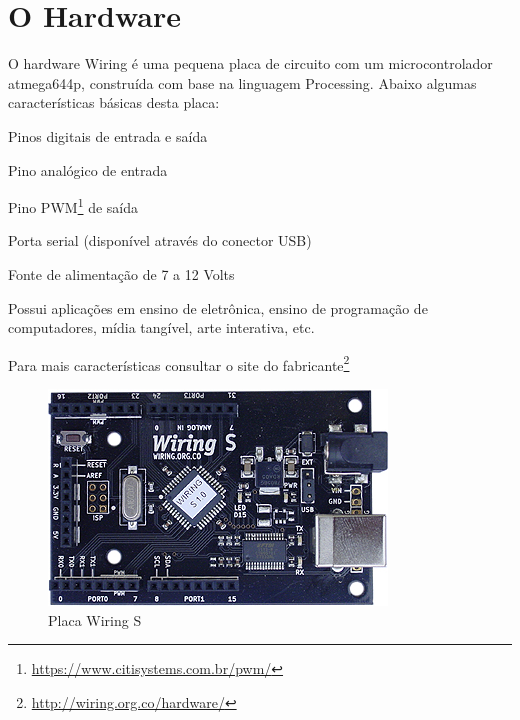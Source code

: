 \section[O Hardware]{O Hardware}

O hardware Wiring é uma pequena placa de circuito com um microcontrolador atmega644p, construída com base na linguagem Processing. Abaixo algumas características básicas desta placa: 

\begin{alineas}
    \item Pinos digitais de entrada e saída
    \item Pino analógico de entrada
    \item Pino PWM\footnote{\url{https://www.citisystems.com.br/pwm/}} de saída
    \item Porta serial (disponível através do conector USB)
    \item Fonte de alimentação de 7 a 12 Volts
\end{alineas}

Possui aplicações em ensino de eletrônica, ensino de programação de computadores, mídia tangível, arte interativa, etc.

Para mais características consultar o site do fabricante\footnote{\url{http://wiring.org.co/hardware/}}

\begin{figure}[htb]
	\caption{\label{wiringS}Placa Wiring S}
	\begin{center}
	    \includegraphics[scale=0.9]{artigo/refs/Rogue_BB_WRS}
	\end{center}
\end{figure}